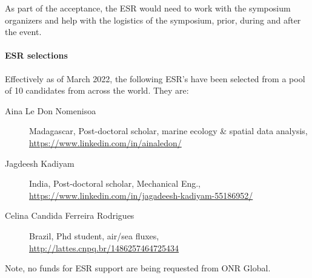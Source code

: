 

\noindent
As part of the acceptance, the ESR would need to work with the symposium
organizers and help with the logistics of the symposium, prior, during
and after the event. %

\paragraph{ESR selections} Effectively as of March 2022, the following
ESR's have been selected from a pool of 10 candidates from across the
world. They are:

\begin{description}

  \item[Aina Le Don Nomenisoa] Madagascar, Post-doctoral scholar,
    marine ecology \& spatial data analysis, \url{https://www.linkedin.com/in/ainaledon/}

  \item[Jagdeesh Kadiyam] India, Post-doctoral scholar, Mechanical Eng., \url{https://www.linkedin.com/in/jagadeesh-kadiyam-55186952/}

  \item[Celina Candida Ferreira Rodrigues] Brazil, Phd student, air/sea fluxes, \url{http://lattes.cnpq.br/1486257464725434}

\end{description}  

Note, no funds for ESR support are being requested from ONR Global.

